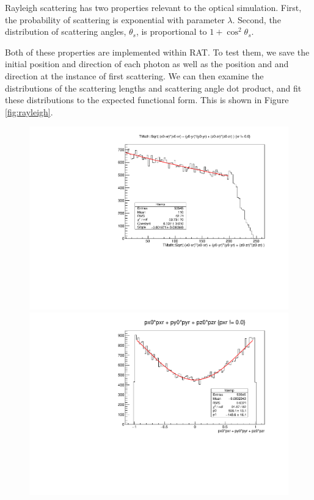\documentclass[aps,pra,notitlepage,groupedaddress]{revtex4-1}
\begin{document}
Rayleigh scattering has two properties relevant to the optical simulation. First, the probability of scattering is exponential with parameter $\lambda$. Second, the distribution of scattering angles, $\theta_s$, is proportional to $1+\cos^2 \theta_s$.

Both of these properties are implemented within RAT. To test them, we save the initial position and direction of each photon as well as the position and and direction at the instance of first scattering. We can then examine the distributions of the scattering lengths and scattering angle dot product, and fit these distributions to the expected functional form. This is shown in Figure \ref{fig:rayleigh}.

\begin{figure}
	\begin{minipage}{0.49\textwidth}
		\includegraphics[width=1.0\textwidth]{figures/rlen}
	\end{minipage}
	\begin{minipage}{0.49\textwidth}
		\includegraphics[width=1.0\textwidth]{figures/rthetadist}

\end{minipage}
\end{figure}
\end{document}
